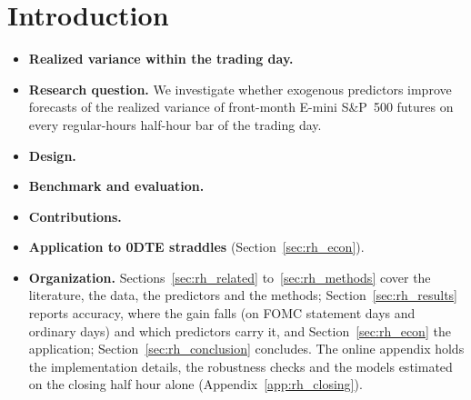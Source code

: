 

\section{Introduction}
\label{sec:rh_intro}
\begin{itemize}
\item \textbf{Realized variance within the trading day.}
\item \textbf{Research question.} We investigate whether exogenous predictors improve forecasts of the
  realized variance of front-month E-mini S\&P~500 futures on every regular-hours half-hour bar of the trading day.
\item \textbf{Design.}
\item \textbf{Benchmark and evaluation.}
\item \textbf{Contributions.}
\item \textbf{Application to 0DTE straddles} (Section~\ref{sec:rh_econ}).
\item \textbf{Organization.} Sections~\ref{sec:rh_related} to~\ref{sec:rh_methods} cover the literature, the data,
  the predictors and the methods; Section~\ref{sec:rh_results} reports accuracy, where the gain falls (on FOMC
  statement days and ordinary days) and which predictors carry it, and Section~\ref{sec:rh_econ} the application;
  Section~\ref{sec:rh_conclusion} concludes. The online appendix holds the implementation details, the robustness
  checks and the models estimated on the closing half hour alone (Appendix~\ref{app:rh_closing}).
\end{itemize}


